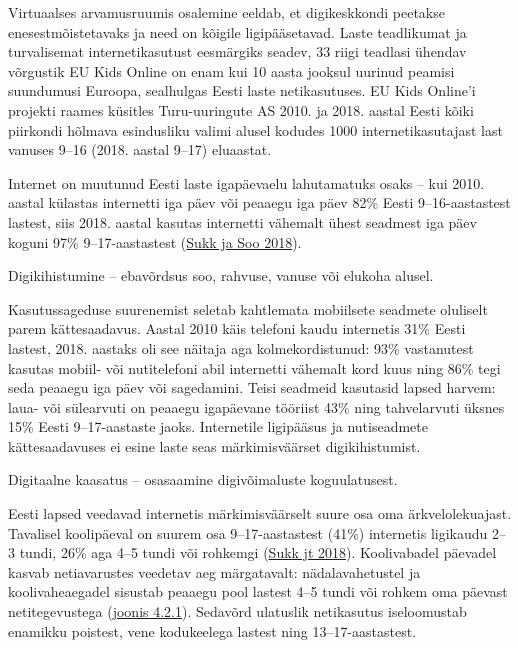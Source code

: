 \documentclass[estonian,]{article}
\begin{document}
Virtuaalses arvamusruumis osalemine eeldab, et digikeskkondi peetakse enesestmõistetavaks ja need on kõigile ligipääsetavad. Laste teadlikumat ja turvalisemat internetikasutust eesmärgiks seadev, 33 riigi teadlasi ühendav võrgustik EU Kids Online on enam kui 10 aasta jooksul uurinud peamisi suundumusi Euroopa, sealhulgas Eesti laste netikasutuses. EU Kids Online'i projekti raames küsitles Turu-uuringute AS 2010. ja 2018. aastal Eesti kõiki piirkondi hõlmava esindusliku valimi alusel kodudes 1000 internetikasutajast last vanuses 9--16 (2018. aastal 9--17) eluaastat.

Internet on muutunud Eesti laste igapäevaelu lahutamatuks osaks -- kui 2010. aastal külastas internetti iga päev või peaaegu iga päev 82\% Eesti 9--16-aastastest lastest, siis 2018. aastal kasutas internetti vähemalt ühest seadmest iga päev koguni 97\% 9--17-aastastest (\protect\hyperlink{Sukk-Soo2018}{Sukk ja Soo 2018}).

\begin{blockquote-left}
Digikihistumine -- ebavõrdsus soo, rahvuse, vanuse või elukoha alusel.
\end{blockquote-left}

Kasutussageduse suurenemist seletab kahtlemata mobiilsete seadmete oluliselt parem kättesaadavus. Aastal 2010 käis telefoni kaudu internetis 31\% Eesti lastest, 2018. aastaks oli see näitaja aga kolmekordistunud: 93\% vastanutest kasutas mobiil- või nutitelefoni abil internetti vähemalt kord kuus ning 86\% tegi seda peaaegu iga päev või sagedamini. Teisi seadmeid kasutasid lapsed harvem: laua- või sülearvuti on peaaegu igapäevane tööriist 43\% ning tahvelarvuti üksnes 15\% Eesti 9--17-aastaste jaoks. Internetile ligipääsus ja nutiseadmete kättesaadavuses ei esine laste seas märkimisväärset digikihistumist.

\begin{blockquote-right}
Digitaalne kaasatus -- osasaamine digivõimaluste koguulatusest.
\end{blockquote-right}

Eesti lapsed veedavad internetis märkimisväärselt suure osa oma ärkvelolekuajast. Tavalisel koolipäeval on suurem osa 9--17-aastastest (41\%) internetis ligikaudu 2--3 tundi, 26\% aga 4--5 tundi või rohkemgi (\protect\hyperlink{Sukk2018}{Sukk jt 2018}). Koolivabadel päevadel kasvab netiavarustes veedetav aeg märgatavalt: nädalavahetustel ja koolivaheaegadel sisustab peaaegu pool lastest 4--5 tundi või rohkem oma päevast netitegevustega (\protect\hyperlink{figure421}{joonis 4.2.1}). Sedavõrd ulatuslik netikasutus iseloomustab enamikku poistest, vene kodukeelega lastest ning 13--17-aastastest.
\end{document}
